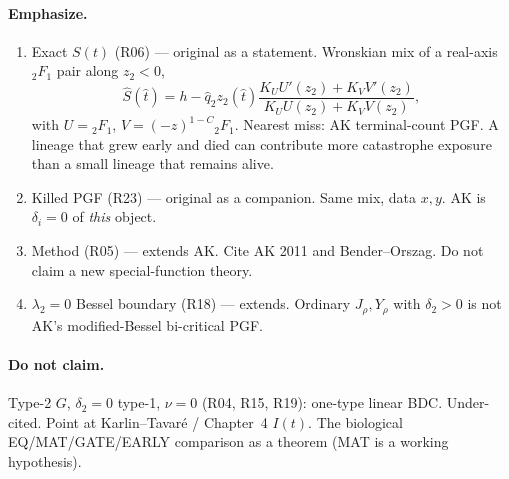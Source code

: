 \documentclass[11pt,a4paper]{report}
\begin{document}
\paragraph{Emphasize.}
\begin{enumerate}
\item Exact \(S(t)\) (R06) --- original as a statement. Wronskian mix of
  a real-axis \({}_2F_1\) pair along \(z_2<0\),
\[
\widehat S(\hat t)=h-\hat q_2 z_2(\hat t)
\frac{K_U U'(z_2)+K_V V'(z_2)}{K_U U(z_2)+K_V V(z_2)},
\]
with \(U={}_2F_1\), \(V=(-z)^{1-C}{}_2F_1\). Nearest miss: AK
terminal-count PGF. A lineage that grew early and died can contribute
more catastrophe exposure than a small lineage that remains alive.
\item Killed PGF (R23) --- original as a companion. Same mix, data
  \(x,y\). AK is \(\delta_i=0\) of \emph{this} object.
\item Method (R05) --- extends AK. Cite AK 2011 and Bender--Orszag. Do
  not claim a new special-function theory.
\item \(\lambda_2=0\) Bessel boundary (R18) --- extends. Ordinary
  \(J_\rho,Y_\rho\) with \(\delta_2>0\) is not AK's modified-Bessel
  bi-critical PGF.
\end{enumerate}

\paragraph{Do not claim.}
Type-2 \(G\), \(\delta_2=0\) type-1, \(\nu=0\) (R04, R15, R19): one-type
linear BDC. Under-cited. Point at Karlin--Tavar\'e / Chapter~4 \(I(t)\).
The biological EQ/MAT/GATE/EARLY comparison as a theorem (MAT is a
working hypothesis).
\end{document}
